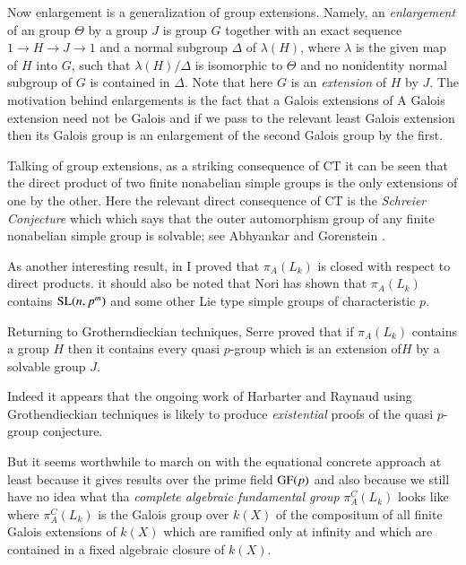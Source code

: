 Now enlargement is a generalization of group extensions. Namely, an \textit{enlargement} of an group $\Theta$ by a group $J$ is group $G$ together with an exact sequence $1 \rightarrow H \rightarrow J \rightarrow 1 $ and a normal subgroup $\Delta$ of $\lambda(H)$, where $\lambda$ is the given map of $H$ into $G$, such that $\lambda(H)/\Delta$ is isomorphic to  $\Theta$ and no nonidentity normal subgroup of $G$ is contained in $\Delta$. Note that here $G$ is an \textit{extension} of $H$ by $J$. The motivation behind enlargements is the fact that a Galois extensions of A Galois extension need not be Galois and if we pass to the relevant least Galois extension then its Galois group is an enlargement of the second Galois group by the first.

Talking of group extensions, as a striking consequence of CT it can be seen that the direct product of two finite nonabelian simple groups is the only extensions of one by the other. Here the relevant direct consequence of CT is the \textit{Schreier Conjecture} which which says that the outer automorphism group of any finite nonabelian simple group is solvable; see Abhyankar \cite{chap1-key11} and Gorenstein \cite{chap1-key32}.

As another interesting result, in \cite{chap1-key12} I proved that $\pi_{A}(L_{k})$ is closed with respect to direct products. it should also be noted that Nori \cite{chap1-key49} has shown that $\pi_{A}(L_{k})$ contains $\operatorname{SL}(n,p^m)$ and some other Lie type simple groups of characteristic $p$.

Returning to Grotherndieckian techniques, Serre \cite{chap1-key56} proved that if $\pi_{A}(L_{k})$ contains a group $H$ then it contains every quasi $p$-group which is an extension of\pageoriginale $H$ by a solvable group $J$. 

Indeed it appears that the ongoing work of Harbarter and Raynaud using Grothendieckian techniques is likely to produce \textit{existential} proofs of the quasi $p$-group conjecture.

But it seems worthwhile to march on with the equational concrete approach at least because it gives results over the prime field $\operatorname{GF}(p)$ and also because we still have no idea what tha \textit{complete algebraic fundamental group} $\pi^{C}_{A}(L_{k})$ looks like where $\pi^{C}_{A}(L_{k})$ is the Galois group over $k(X)$ of the compositum of all finite Galois extensions of $k(X)$ which are ramified only at infinity and which are contained in a fixed algebraic closure of $k(X)$. 


